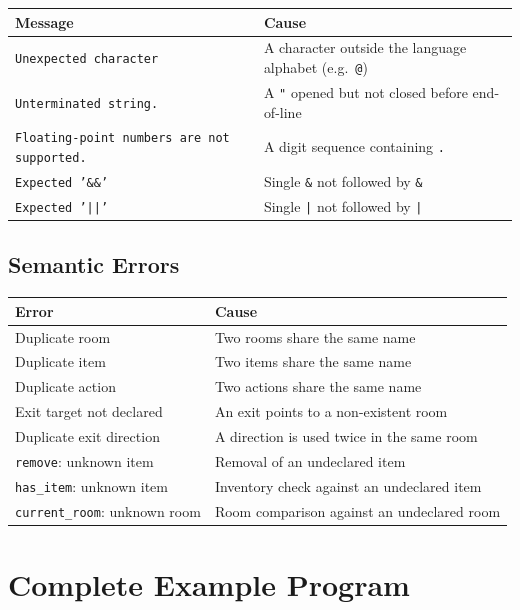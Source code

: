 \documentclass[12pt, a4paper]{article}
\begin{document}
\begin{center}
\begin{tabular}{p{5cm} p{8cm}}
\toprule
\textbf{Message} & \textbf{Cause} \\
\midrule
\texttt{Unexpected character} & A character outside the language alphabet (e.g.\ \texttt{@}) \\
\texttt{Unterminated string.} & A \texttt{"} opened but not closed before end-of-line \\
\texttt{Floating-point numbers are not supported.} & A digit sequence containing \texttt{.} \\
\texttt{Expected '\&\&'} & Single \texttt{\&} not followed by \texttt{\&} \\
\texttt{Expected '||'} & Single \texttt{|} not followed by \texttt{|} \\
\bottomrule
\end{tabular}
\end{center}

\subsection{Semantic Errors}

\begin{center}
\begin{tabular}{p{5.5cm} p{7.5cm}}
\toprule
\textbf{Error} & \textbf{Cause} \\
\midrule
Duplicate room & Two rooms share the same name \\
Duplicate item & Two items share the same name \\
Duplicate action & Two actions share the same name \\
Exit target not declared & An exit points to a non-existent room \\
Duplicate exit direction & A direction is used twice in the same room \\
\texttt{remove}: unknown item & Removal of an undeclared item \\
\texttt{has\_item}: unknown item & Inventory check against an undeclared item \\
\texttt{current\_room}: unknown room & Room comparison against an undeclared room \\
\bottomrule
\end{tabular}
\end{center}

\section{Complete Example Program}
\end{document}
